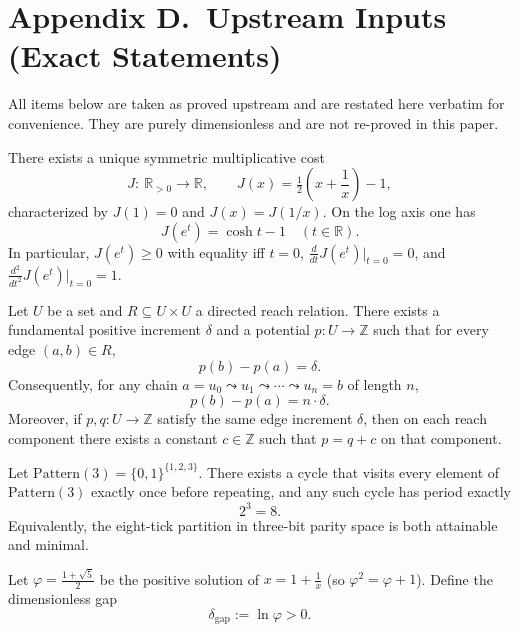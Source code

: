 \documentclass[11pt]{article}
\theoremstyle{plain}
\theoremstyle{definition}
\theoremstyle{remark}
\begin{document}
\section*{Appendix D.\ Upstream Inputs (Exact Statements)}

All items below are taken as proved upstream and are restated here verbatim for convenience. They are purely dimensionless and are not re-proved in this paper.

\begin{theorem}
There exists a unique symmetric multiplicative cost
\[
J:\ \mathbb{R}_{>0}\to\mathbb{R},\qquad
J(x)=\tfrac12\!\left(x+\frac{1}{x}\right)-1,
\]
characterized by \(J(1)=0\) and \(J(x)=J(1/x)\). On the log axis one has
\[
J(e^{t})=\cosh t-1\quad(t\in\mathbb{R}).
\]
In particular, \(J(e^{t})\ge 0\) with equality iff \(t=0\), \(\frac{d}{dt}J(e^{t})\big|_{t=0}=0\), and \(\frac{d^{2}}{dt^{2}}J(e^{t})\big|_{t=0}=1\).
\end{theorem}

\begin{theorem}
Let \(U\) be a set and \(R\subseteq U\times U\) a directed reach relation. There exists a fundamental positive increment \(\delta\) and a potential \(p:U\to\mathbb{Z}\) such that for every edge \((a,b)\in R\),
\[
p(b)-p(a)=\delta.
\]
Consequently, for any chain \(a=u_{0}\leadsto u_{1}\leadsto\cdots\leadsto u_{n}=b\) of length \(n\),
\[
p(b)-p(a)=n\cdot\delta.
\]
Moreover, if \(p,q:U\to\mathbb{Z}\) satisfy the same edge increment \(\delta\), then on each reach component there exists a constant \(c\in\mathbb{Z}\) such that \(p=q+c\) on that component.
\end{theorem}

\begin{theorem}[UP-3: Minimal parity cycle in \(D=3\)]
Let \(\mathrm{Pattern}(3)=\{0,1\}^{\{1,2,3\}}\). There exists a cycle that visits every element of \(\mathrm{Pattern}(3)\) exactly once before repeating, and any such cycle has period exactly
\[
2^{3}=8.
\]
Equivalently, the eight-tick partition in three-bit parity space is both attainable and minimal.
\end{theorem}

\begin{theorem}
Let \(\varphi=\tfrac{1+\sqrt{5}}{2}\) be the positive solution of \(x=1+\tfrac{1}{x}\) (so \(\varphi^{2}=\varphi+1\)). Define the dimensionless gap
\[
\delta_{\mathrm{gap}}:=\ln\varphi>0.
\]
\end{theorem}
\end{document}
